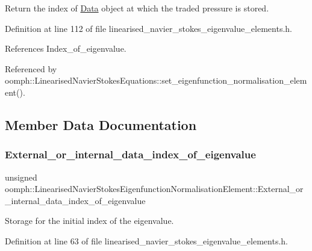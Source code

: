 Return the index of \hyperlink{classoomph_1_1Data}{Data} object at which the traded pressure is stored. 



Definition at line 112 of file linearised\+\_\+navier\+\_\+stokes\+\_\+eigenvalue\+\_\+elements.\+h.



References Index\+\_\+of\+\_\+eigenvalue.



Referenced by oomph\+::\+Linearised\+Navier\+Stokes\+Equations\+::set\+\_\+eigenfunction\+\_\+normalisation\+\_\+element().



\subsection{Member Data Documentation}
\mbox{\label{classoomph_1_1LinearisedNavierStokesEigenfunctionNormalisationElement_ab76cf80d4d2c9856b1bde4b835107c99}} 
\subsubsection{\texorpdfstring{External\+\_\+or\+\_\+internal\+\_\+data\+\_\+index\+\_\+of\+\_\+eigenvalue}{External\_or\_internal\_data\_index\_of\_eigenvalue}}
{\footnotesize\ttfamily unsigned oomph\+::\+Linearised\+Navier\+Stokes\+Eigenfunction\+Normalisation\+Element\+::\+External\+\_\+or\+\_\+internal\+\_\+data\+\_\+index\+\_\+of\+\_\+eigenvalue\hspace{0.3cm}{\ttfamily [private]}}



Storage for the initial index of the eigenvalue. 



Definition at line 63 of file linearised\+\_\+navier\+\_\+stokes\+\_\+eigenvalue\+\_\+elements.\+h.



